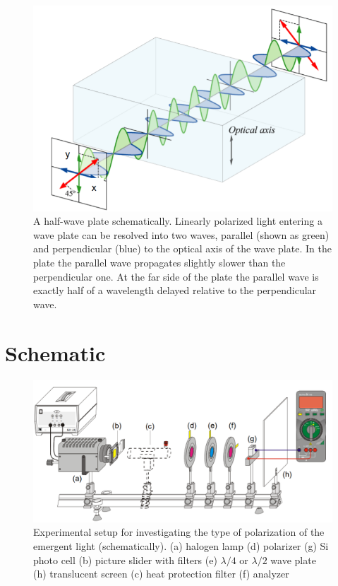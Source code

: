\documentclass{article}
\begin{document}
\begin{figure}
    \centering
    \includegraphics[scale = 0.79]{Figures/halfwaveplate.png}
    \caption{A half-wave plate schematically. Linearly polarized light entering a wave plate can be resolved into two waves, parallel (shown as green) and perpendicular (blue) to the optical axis of the wave plate. In the plate the parallel wave propagates slightly slower than the perpendicular one. At the far side of the plate the parallel wave is exactly half of a wavelength delayed relative to the perpendicular wave. }
    \label{fig:halfwaveplate}
\end{figure}


\section{Schematic}

\begin{figure}[!htb]
    \centering
    \includegraphics[scale = 0.45]{Figures/schematic.png}
    \captionsetup{justification=centering}
    \caption{Experimental setup for investigating the type of polarization of the emergent light (schematically). (a) halogen lamp (d) polarizer (g) Si photo cell (b) picture slider with filters (e) $\lambda /4$ or $\lambda /2$ wave plate (h) translucent screen (c) heat protection filter (f) analyzer}
    \label{fig:schematic}
\end{figure}
\end{document}
